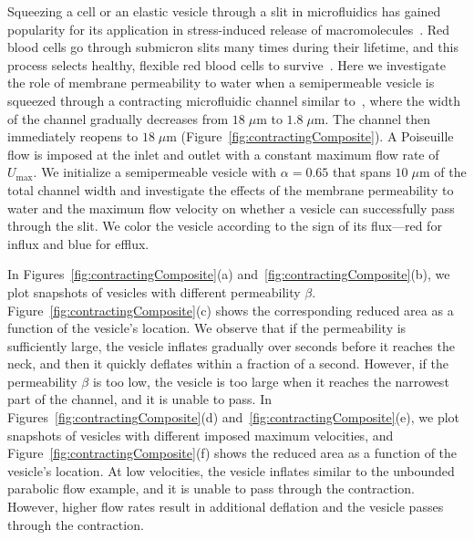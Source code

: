 \documentclass[prb,preprint,showpacs,preprintnumbers,amsmath,amssymb,longbibliography]{revtex4-1}
\begin{document}
Squeezing a cell or an elastic vesicle through a slit in microfluidics
has gained popularity for its application in stress-induced release of
macromolecules~\cite{ShareiEtAl2013_PNAS, Pak2015_PNAS,
ZhangShenHoganBarakatMisbah2018_BJ, LuoBai2019_PoF}. Red blood cells go
through submicron slits many times during their lifetime, and this
process selects healthy, flexible red blood cells to
survive~\cite{wu2015critical,LuPeng2019_PoF}. Here we investigate the
role of membrane permeability to water when a semipermeable vesicle is
squeezed through a contracting microfluidic channel similar
to~\cite{wu2015critical}, where the width of the channel gradually
decreases from $18 \;\mu$m to $1.8\; \mu$m. The channel then immediately
reopens to $18\;\mu$m (Figure~\ref{fig:contractingComposite}). A
Poiseuille flow is imposed at the inlet and outlet with a constant
maximum flow rate of $U_{\max}$. We initialize a semipermeable vesicle
with $\alpha = 0.65$ that spans $10\; \mu$m of the total channel width
and investigate the effects of the membrane permeability to water and
the maximum flow velocity on whether a vesicle can successfully pass
through the slit. We color the vesicle according to the sign of its
flux---red for influx and blue for efflux.

In Figures~\ref{fig:contractingComposite}(a)
and~\ref{fig:contractingComposite}(b), we plot snapshots of vesicles
with different permeability $\beta$.
Figure~\ref{fig:contractingComposite}(c) shows the corresponding reduced
area as a function of the vesicle's location. We observe that if the
permeability is sufficiently large, the vesicle inflates gradually over
seconds before it reaches the neck, and then it quickly deflates within
a fraction of a second. However, if the permeability $\beta$ is too
low, the vesicle is too large when it reaches the narrowest part of the
channel, and it is unable to pass. In
Figures~\ref{fig:contractingComposite}(d)
and~\ref{fig:contractingComposite}(e), we plot snapshots of vesicles
with different imposed maximum velocities, and
Figure~\ref{fig:contractingComposite}(f) shows the reduced area as a
function of the vesicle's location. At low velocities, the vesicle
inflates similar to the unbounded parabolic flow example, and it is
unable to pass through the contraction. However, higher flow rates
result in additional deflation and the vesicle passes through the
contraction.
\end{document}
